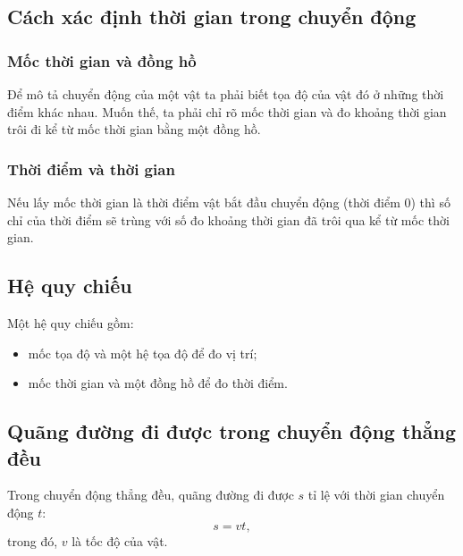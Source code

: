 \subsection{Cách xác định thời gian trong chuyển động}
\subsubsection{Mốc thời gian và đồng hồ}
Để mô tả chuyển động của một vật ta phải biết tọa độ của vật đó ở những thời điểm khác nhau. Muốn thế, ta phải chỉ rõ mốc thời gian và đo khoảng thời gian trôi đi kể từ mốc thời gian bằng một đồng hồ.
\subsubsection{Thời điểm và thời gian}
Nếu lấy mốc thời gian là thời điểm vật bắt đầu chuyển động (thời điểm 0) thì số chỉ của thời điểm sẽ trùng với số đo khoảng thời gian đã trôi qua kể từ mốc thời gian.
\subsection{Hệ quy chiếu}
Một hệ quy chiếu gồm:
\begin{itemize}
	\item mốc tọa độ và một hệ tọa độ để đo vị trí;
	\item mốc thời gian và một đồng hồ để đo thời điểm.
\end{itemize}
\subsection{Quãng đường đi được trong chuyển động thẳng đều}
Trong chuyển động thẳng đều, quãng đường đi được $s$ tỉ lệ với thời gian chuyển động $t$:
\begin{equation*}
	s=vt,
\end{equation*}
trong đó, $v$ là tốc độ của vật.
